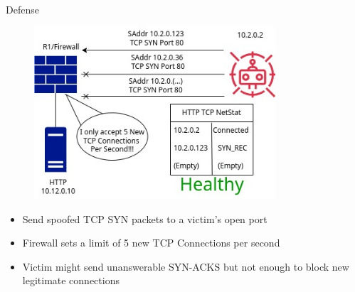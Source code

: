 \documentclass{beamer}
\begin{document}
\begin{frame}
\begin{columns}
\begin{column}{0.5\textwidth}
        \\
        \Large Defense
        \begin{figure}
            \centering
            \includegraphics[width=0.8\textwidth]{flood_defense.jpg}\\
        \end{figure}
            \begin{itemize}[label={}]
                \item \footnotesize Send spoofed TCP SYN packets to a victim's open port
                \item \footnotesize Firewall sets a limit of 5 new TCP Connections per second
                \item \footnotesize Victim might send unanswerable SYN-ACKS but not enough to block new legitimate connections
            \end{itemize}
    \end{column}
\end{columns}
\end{frame}
\end{document}
